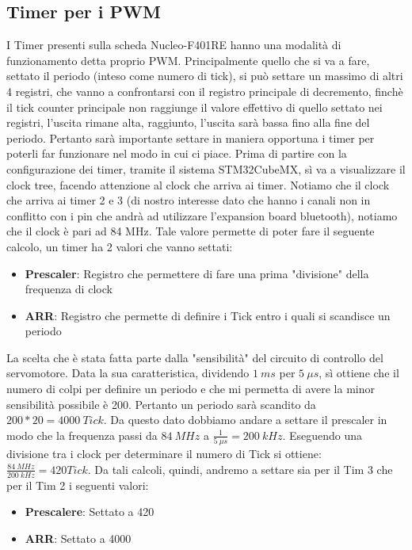 \subsection{Timer per i PWM}
I Timer presenti sulla scheda Nucleo-F401RE hanno una modalità di funzionamento detta proprio PWM. Principalmente quello che si va a fare, settato il periodo (inteso come numero di tick), si può settare un massimo di altri 4 registri, che vanno a confrontarsi con il registro principale di decremento, finchè il tick counter principale non raggiunge il valore effettivo di quello settato nei registri, l'uscita rimane alta, raggiunto, l'uscita sarà bassa fino alla fine del periodo. Pertanto sarà importante settare in maniera opportuna i timer per poterli far funzionare nel modo in cui ci piace.
Prima di partire con la configurazione dei timer, tramite il sistema STM32CubeMX, sì va a visualizzare il clock tree, facendo attenzione al clock che arriva ai timer. Notiamo che il clock che arriva ai timer 2 e 3 (di nostro interesse dato che hanno i canali non in conflitto con i pin che andrà ad utilizzare l'expansion board bluetooth), notiamo che il clock è pari ad 84 MHz. 
Tale valore permette di poter fare il seguente calcolo, un timer ha 2 valori che vanno settati:
\begin{itemize}
	\item \textbf{Prescaler}: Registro che permettere di fare una prima "divisione" della frequenza di clock

	\item \textbf{ARR}: Registro che permette di definire i Tick entro i quali si scandisce un periodo

\end{itemize}

La scelta che è stata fatta parte dalla "sensibilità" del circuito di controllo del servomotore. Data la sua caratteristica, dividendo \(1\ ms\) per \(5\ \mu s\), sì ottiene che il numero di colpi per definire un periodo e che mi permetta di avere la minor sensibilità possibile è 200. Pertanto un periodo sarà scandito da \(200 * 20 = 4000\ Tick\). Da questo dato dobbiamo andare a settare il prescaler in modo che la frequenza passi da \(84\ MHz\) a \(\frac{1}{5\ \mu s} = 200\ kHz\). Eseguendo una divisione tra i clock per determinare il numero di Tick si ottiene:
\(\frac{84\ MHz}{200\ kHz} = 420 Tick\). Da tali calcoli, quindi, andremo a settare sia per il Tim 3 che per il Tim 2 i seguenti valori:
\begin{itemize}
	\item \textbf{Prescalere}: Settato a 420
	\item \textbf{ARR}: Settato a 4000
\end{itemize}

